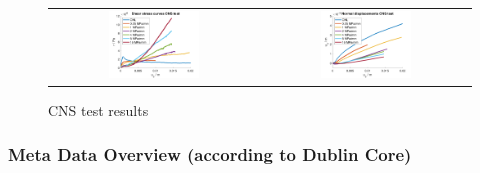 \begin{figure}[!ht]
\begin{tabular}{cc}
\includegraphics[width=0.45\textwidth]{./figures/CNSShearCurvesAll.png}     
& 
\includegraphics[width=0.45\textwidth]{./figures/CNSDilatationAll.png} 
\end{tabular}
\caption{CNS test results}
\label{fig:DataCNSBasaltLab}
\end{figure}

\subsubsection*{Meta Data Overview (according to Dublin Core)}

